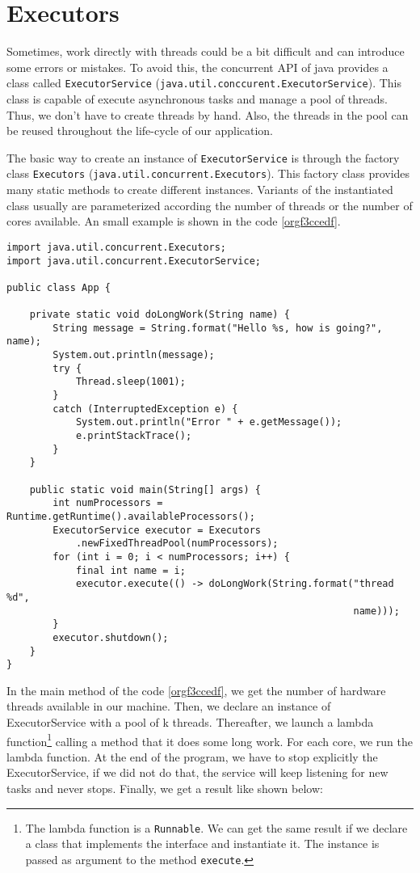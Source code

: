 \documentclass{latex/classes/myarticle}
\begin{document}
\section{Executors}
\label{sec:orgf508d5e}

Sometimes, work directly with threads could be a bit difficult and can
introduce some errors or mistakes. To avoid this, the concurrent API of java
provides a class called \texttt{ExecutorService}
(\texttt{java.util.conccurent.ExecutorService}). This class is capable of execute
asynchronous tasks and manage a pool of threads. Thus, we don't have to
create threads by hand. Also, the threads in the pool can be reused
throughout the life-cycle of our application.

The basic way to create an instance of \texttt{ExecutorService} is through the factory
class \texttt{Executors} (\texttt{java.util.concurrent.Executors}). This factory class provides
many static methods to create different instances. Variants of the
instantiated class usually are parameterized according the number of threads
or the number of cores available. An small example is shown in the code
\ref{orgf3ccedf}.

\begin{lstlisting}
import java.util.concurrent.Executors;
import java.util.concurrent.ExecutorService;

public class App {

    private static void doLongWork(String name) {
        String message = String.format("Hello %s, how is going?", name);
        System.out.println(message);
        try {
            Thread.sleep(1001);
        }
        catch (InterruptedException e) {
            System.out.println("Error " + e.getMessage());
            e.printStackTrace();
        }
    }

    public static void main(String[] args) {
        int numProcessors = Runtime.getRuntime().availableProcessors();
        ExecutorService executor = Executors
            .newFixedThreadPool(numProcessors);
        for (int i = 0; i < numProcessors; i++) {
            final int name = i;
            executor.execute(() -> doLongWork(String.format("thread %d",
                                                            name)));
        }
        executor.shutdown();
    }
}
\end{lstlisting}

In the main method of the code \ref{orgf3ccedf}, we get the number of hardware
threads available in our machine. Then, we declare an instance of
ExecutorService with a pool of k threads. Thereafter, we launch a lambda
function\footnote{The lambda function is a \texttt{Runnable}. We can get the same result if we
declare a class that implements the interface and instantiate it. The instance
is passed as argument to the method \texttt{execute}.} calling a method that it does some long work. For each core,
we run the lambda function. At the end of the program, we have to stop
explicitly the ExecutorService, if we did not do that, the service will keep
listening for new tasks and never stops. Finally, we get a result like shown
below:
\end{document}
